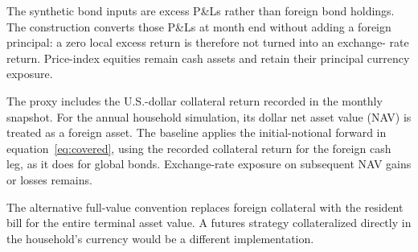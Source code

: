 The synthetic bond inputs are excess P\&Ls rather than foreign bond holdings.
The construction converts those P\&Ls at month end without adding a foreign
principal: a zero local excess return is therefore not turned into an exchange-
rate return. Price-index equities remain cash assets and retain their principal
currency exposure.

The proxy includes the U.S.-dollar collateral return recorded in the monthly
snapshot. For the annual household simulation, its dollar net asset value
(NAV) is treated as a foreign asset. The baseline applies the
initial-notional forward in equation~\eqref{eq:covered}, using the recorded
collateral return for the foreign cash leg, as it does for global bonds.
Exchange-rate exposure on subsequent NAV gains or losses remains.

The alternative full-value convention replaces foreign collateral with the
resident bill for the entire terminal asset value. A futures strategy
collateralized directly in the household's currency would be a different
implementation.

